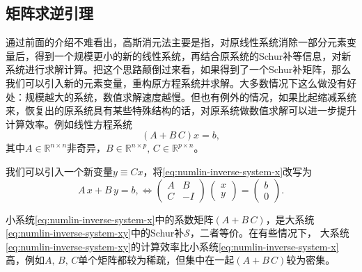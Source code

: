 \begin{subappendices}
\subsection{矩阵求逆引理}
\label{sec:numlin-matrix-inversion-lemma}

通过前面的介绍不难看出，高斯消元法主要是指，对原线性系统消除一部分元素变量后，得到一个规模更小的新的线性系统，再结合原系统的Schur补等信息，对新系统进行求解计算。把这个思路颠倒过来看，如果得到了一个Schur补矩阵，那么我们可以引入新的元素变量，重构原方程系统并求解。大多数情况下这么做没有好处：规模越大的系统，数值求解速度越慢。但也有例外的情况，如果比起缩减系统来，恢复出的原系统具有某些特殊结构的话，对原系统做数值求解可以进一步提升计算效率。例如线性方程系统
\begin{equation}
  \label{eq:numlin-inverse-system-x}
  \left( A + B \, C \right) x = b,
\end{equation}
其中$A \in \mathbb{R}^{n \times n}$非奇异，$B \in \mathbb{R}^{n \times p}, \, C \in \mathbb{R}^{p \times n}$。

我们可以引入一个新变量$y \equiv C x$，将\eqref{eq:numlin-inverse-system-x}改写为
\begin{equation}
  \label{eq:numlin-inverse-system-xy}
  A \, x + B \, y = b, \Longleftrightarrow
  \begin{pmatrix}
    A & B \\
    C & - I
  \end{pmatrix}
  \,
  \begin{pmatrix}
    x \\ y
  \end{pmatrix}
  =
  \begin{pmatrix}
    b \\ 0
  \end{pmatrix}.
\end{equation}

小系统\eqref{eq:numlin-inverse-system-x}中的系数矩阵$\left( A + B \, C \right)$，是大系统\eqref{eq:numlin-inverse-system-xy}中的Schur补$\mathcal{S}$，二者等价。在有些情况下，
大系统\eqref{eq:numlin-inverse-system-xy}的计算效率比小系统\eqref{eq:numlin-inverse-system-x}高，例如$A, \,B,\, C$单个矩阵都较为稀疏，但集中在一起$\left( A + B \, C \right)$较为密集。


\end{subappendices}
